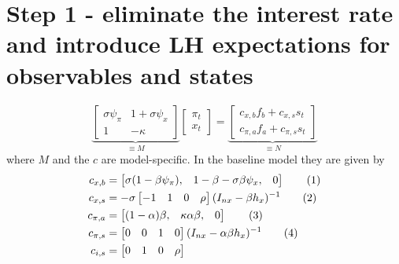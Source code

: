 \documentclass[11pt]{article}
\renewcommand{\[}{\begin{equation}}
\renewcommand{\]}{\end{equation}}
\newcommand\numberthis{\addtocounter{equation}{1}\tag{\theequation}} %
\begin{document}
\section{Step 1 - eliminate the interest rate and introduce LH expectations for observables and states}
\begin{equation}
\underbrace{\begin{bmatrix} \sigma\psi_{\pi}&  1+\sigma\psi_x\\ 1& -\kappa \end{bmatrix}}_{\equiv M}\begin{bmatrix} \pi_t \\ x_t \end{bmatrix} = \underbrace{\begin{bmatrix} c_{x,b}f_b +c_{x,s} s_t \\ c_{\pi,a}f_a +c_{\pi,s} s_t \end{bmatrix}}_{\equiv N}
\end{equation}
where $M$ and the $c$ are model-specific. In the baseline model they are given by
\begin{align*}
 c_{x,b} & =  \begin{bmatrix} \sigma(1-\beta\psi_{\pi}), &1-\beta-\sigma\beta\psi_x ,&0 \end{bmatrix} \numberthis\\
 c_{x,s} & =  -\sigma\begin{bmatrix} -1 &1 & 0 & \rho \end{bmatrix}(I_{nx}-\beta h_x)^{-1} \numberthis \\
 c_{\pi,a} & =  \begin{bmatrix} (1-\alpha)\beta, &\kappa\alpha\beta ,& 0 \end{bmatrix} \numberthis \\
 c_{\pi,s} & =  \begin{bmatrix} 0&0 & 1 & 0 \end{bmatrix}(I_{nx}-\alpha\beta h_x)^{-1} \numberthis \\
  c_{i,s} & =  \begin{bmatrix} 0 &1 & 0 & \rho \end{bmatrix}
\end{align*}
\end{document}
